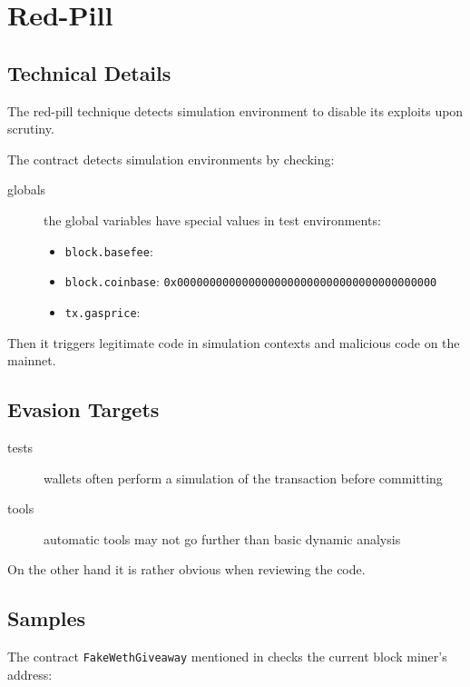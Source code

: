 \section{Red-Pill} \label{sec:red-pill}

\subsection{Technical Details}

The red-pill technique detects simulation environment to disable its exploits upon scrutiny. 

The contract detects simulation environments by checking:

\begin{description}
\item[globals]{the global variables have special values in test environments:
\begin{itemize}
    \item{\lstinline[language=Solidity]{block.basefee}:}
    \item{\lstinline[language=Solidity]{block.coinbase}: \lstinline{0x0000000000000000000000000000000000000000}}
    \item{\lstinline[language=Solidity]{tx.gasprice}:}
\end{itemize}}
\end{description}

Then it triggers legitimate code in simulation contexts and malicious code on the mainnet.

\subsection{Evasion Targets}

\begin{description}
\item[tests]{wallets often perform a simulation of the transaction before committing}
\item[tools]{automatic tools may not go further than basic dynamic analysis}
\end{description}

On the other hand it is rather obvious when reviewing the code.

\subsection{Samples}

The contract \lstinline{FakeWethGiveaway} mentioned in \cite{article-red-pill} checks the current block miner’s address:

